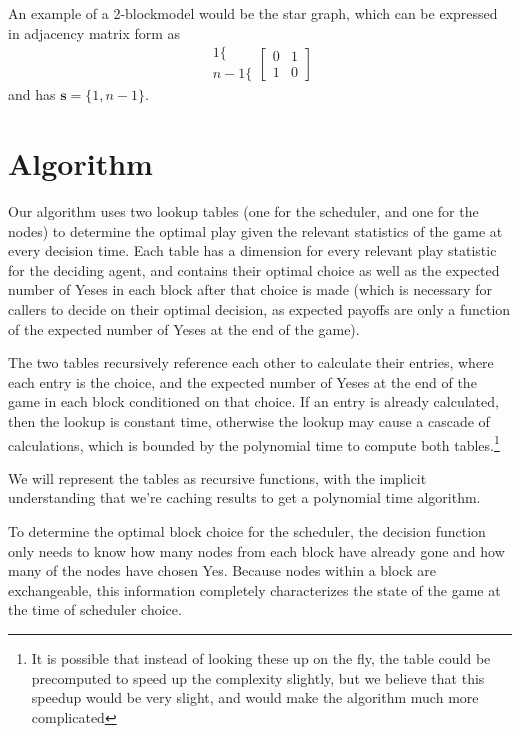 \documentclass{article}
\begin{document}
An example of a 2-blockmodel would be the star graph, which can be
expressed in adjacency matrix form as
\begin{equation*}
  \begin{array}{r}
    1 \{ \\
    n-1 \{
  \end{array}
  \left[ \begin{array}{cc}
      0 & 1 \\
      1 & 0
      \end{array} \right]
\end{equation*}
and has $\mathbf s = \{1, n-1\}$.

\section{Algorithm}
\label{sec:algorithm}

Our algorithm uses two lookup tables (one for the scheduler, and one
for the nodes) to determine the optimal play given the relevant
statistics of the game at every decision time. Each table has a
dimension for every relevant play statistic for the deciding agent,
and contains their optimal choice as well as the expected number of
Yeses in each block after that choice is made (which is necessary for
callers to decide on their optimal decision, as expected payoffs are
only a function of the expected number of Yeses at the end of the
game).

The two tables recursively reference each other to calculate their
entries, where each entry is the choice, and the expected number of
Yeses at the end of the game in each block conditioned on that
choice. If an entry is already calculated, then the lookup is constant
time, otherwise the lookup may cause a cascade of calculations, which
is bounded by the polynomial time to compute both tables.\footnote{It
  is possible that instead of looking these up on the fly, the table
  could be precomputed to speed up the complexity slightly, but we
  believe that this speedup would be very slight, and would make the
  algorithm much more complicated}

We will represent the tables as recursive functions, with the implicit
understanding that we're caching results to get a polynomial time
algorithm.

To determine the optimal block choice for the scheduler, the decision
function only needs to know how many nodes from each block have
already gone and how many of the nodes have chosen Yes. Because nodes
within a block are exchangeable, this information completely
characterizes the state of the game at the time of scheduler choice.
\end{document}
